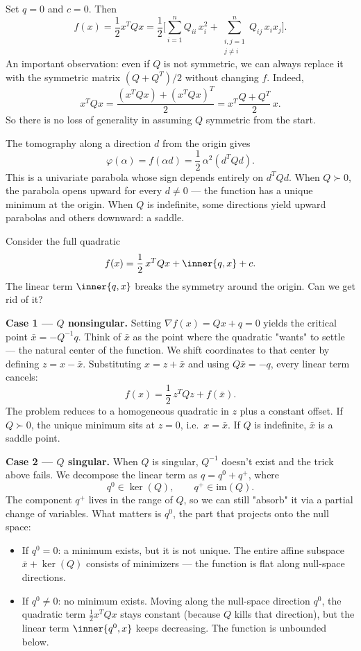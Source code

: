 \begin{exm}
  Set $q = 0$ and $c = 0$.
  Then
  $$
    f(x) = \frac{1}{2} x^T Q x
    = \frac{1}{2}\biggl[\sum_{i=1}^{n} Q_{ii}\, x_i^2
      + \sum_{\substack{i,j=1 \\ j \neq i}}^{n} Q_{ij}\, x_i x_j\biggr].
  $$
  An important observation: even if $Q$ is not symmetric, we can always replace it with the symmetric matrix $(Q + Q^T)/2$ without changing $f$.
  Indeed,
  $$
    x^T Q x
    = \frac{(x^T Q x) + (x^T Q x)^T}{2}
    = x^T \frac{Q + Q^T}{2}\, x.
  $$
  So there is no loss of generality in assuming $Q$ symmetric from the start.

  The tomography along a direction $d$ from the origin gives
  $$
    \varphi(\alpha) = f(\alpha d) = \frac{1}{2}\, \alpha^2 (d^T Q d).
  $$
  This is a univariate parabola whose sign depends entirely on $d^T Q d$.
  When $Q \succ 0$, the parabola opens upward for every $d \neq 0$ — the function has a unique minimum at the origin.
  When $Q$ is indefinite, some directions yield upward parabolas and others downward: a saddle.
\end{exm}

\begin{exm}
  Consider the full quadratic
  $$
    f(x) = \frac{1}{2}\, x^T Q x + \inner{q, x} + c.
  $$
  The linear term $\inner{q, x}$ breaks the symmetry around the origin.
  Can we get rid of it?

  \textbf{Case 1 — $Q$ nonsingular.}
  Setting $\nabla f(x) = Qx + q = 0$ yields the critical point $\bar{x} = -Q^{-1} q$.
  Think of $\bar{x}$ as the point where the quadratic "wants" to settle — the natural center of the function.
  We shift coordinates to that center by defining $z = x - \bar{x}$.
  Substituting $x = z + \bar{x}$ and using $Q \bar{x} = -q$, every linear term cancels:
  $$
    f(x) = \frac{1}{2}\, z^T Q z + f(\bar{x}).
  $$
  The problem reduces to a homogeneous quadratic in $z$ plus a constant offset.
  If $Q \succ 0$, the unique minimum sits at $z = 0$, i.e.\ $x = \bar{x}$.
  If $Q$ is indefinite, $\bar{x}$ is a saddle point.

  \textbf{Case 2 — $Q$ singular.}
  When $Q$ is singular, $Q^{-1}$ doesn't exist and the trick above fails.
  We decompose the linear term as $q = q^0 + q^+$, where
  $$
    q^0 \in \ker(Q), \qquad q^+ \in \mathrm{im}(Q).
  $$
  The component $q^+$ lives in the range of $Q$, so we can still "absorb" it via a partial change of variables.
  What matters is $q^0$, the part that projects onto the null space:
  \begin{itemize}
    \item If $q^0 = 0$: a minimum exists, but it is not unique.
      The entire affine subspace $\bar{x} + \ker(Q)$ consists of minimizers — the function is flat along null-space directions.
    \item If $q^0 \neq 0$: no minimum exists.
      Moving along the null-space direction $q^0$, the quadratic term $\frac{1}{2} x^T Q x$ stays constant (because $Q$ kills that direction), but the linear term $\inner{q^0, x}$ keeps decreasing.
      The function is unbounded below.
  \end{itemize}
\end{exm}